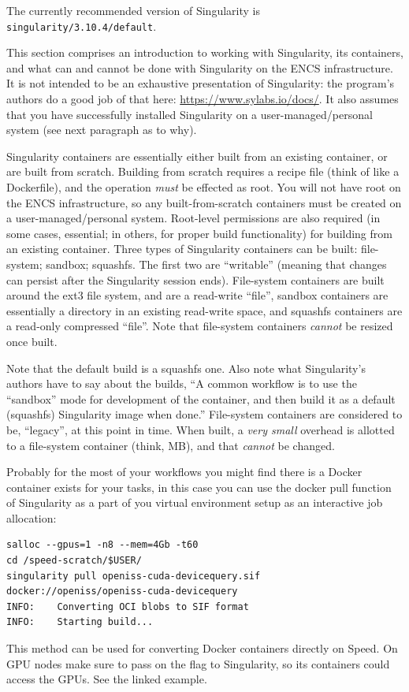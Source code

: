 The currently recommended version of Singularity is
\texttt{singularity/3.10.4/default}.

This section comprises an introduction to working with Singularity, its 
containers, and what can and cannot be done with Singularity on the ENCS 
infrastructure. It is not intended to be an exhaustive presentation of 
Singularity: the program's authors do a good job of that here:
\url{https://www.sylabs.io/docs/}. It also assumes that you have successfully installed 
Singularity on a user-managed/personal system (see next paragraph as to why).

Singularity containers are essentially either built from an existing 
container, or are built from scratch. Building from scratch requires a recipe 
file (think of like a Dockerfile), and the operation \emph{must} be effected as root.
You will not have root on the ENCS infrastructure, so any built-from-scratch containers must be created 
on a user-managed/personal system. Root-level permissions are also required
(in some cases, essential; in others, for proper build functionality) for 
building from an existing container.
%
Three types of Singularity containers can be built: file-system; sandbox; 
squashfs. The first two are ``writable'' (meaning that changes can persist 
after the Singularity session ends). File-system containers are built around 
the ext3 file system, and are a read-write ``file'', sandbox containers are 
essentially a directory in an existing read-write space, and squashfs 
containers are a read-only compressed ``file''. Note that file-system 
containers \emph{cannot} be resized once built.

Note that the default build is a squashfs one. Also note what Singularity's 
authors have to say about the builds, ``A common workflow is to use the 
``sandbox'' mode for development of the container, and then build it as a 
default (squashfs) Singularity image when done.'' File-system containers are 
considered to be, ``legacy'', at this point in time. When built, a \emph{very small}
overhead is allotted to a file-system container (think, MB), and that 
\emph{cannot} be changed.

Probably for the most of your workflows you might find there is a
Docker container exists for your tasks, in this case you
can use the docker pull function of Singularity as a part
of you virtual environment setup as an interactive job
allocation:

\small
\begin{verbatim}
salloc --gpus=1 -n8 --mem=4Gb -t60
cd /speed-scratch/$USER/
singularity pull openiss-cuda-devicequery.sif docker://openiss/openiss-cuda-devicequery
INFO:    Converting OCI blobs to SIF format
INFO:    Starting build...
\end{verbatim}
\normalsize

\noindent
This method can be used for converting Docker containers directly on Speed.
On GPU nodes make sure to pass on the  flag to Singularity,
so its containers could access the GPUs. See the linked example.
